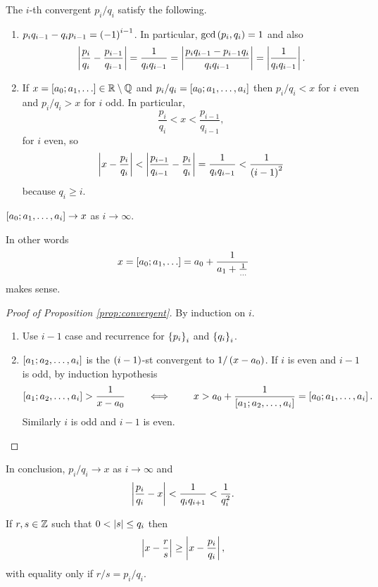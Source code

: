 \begin{proposition}
\label{prop:convergent}
The $ i $-th convergent $ p_i / q_i $ satisfy the following.
\begin{enumerate}
\item $ p_iq_{i - 1} - q_ip_{i - 1} = \rb{-1}^{i - 1} $. In particular, $ \gcd\rb{p_i, q_i} = 1 $ and also
$$ \abs{\dfrac{p_i}{q_i} - \dfrac{p_{i - 1}}{q_{i - 1}}} = \dfrac{1}{q_iq_{i - 1}} = \abs{\dfrac{p_iq_{i - 1} - p_{i - 1}q_i}{q_iq_{i - 1}}} = \abs{\dfrac{1}{q_iq_{i - 1}}}. $$
\item If $ x = \sb{a_0; a_1, \dots} \in \R \setminus \Q $ and $ p_i / q_i = \sb{a_0; a_1, \dots, a_i} $ then $ p_i / q_i < x $ for $ i $ even and $ p_i / q_i > x $ for $ i $ odd. In particular,
$$ \dfrac{p_i}{q_i} < x < \dfrac{p_{i - 1}}{q_{i - 1}}, $$
for $ i $ even, so
$$ \abs{x - \dfrac{p_i}{q_i}} < \abs{\dfrac{p_{i - 1}}{q_{i - 1}} - \dfrac{p_i}{q_i}} = \dfrac{1}{q_iq_{i - 1}} < \dfrac{1}{\rb{i - 1}^2} $$
because $ q_i \ge i $.
\end{enumerate}
\end{proposition}

\begin{corollary}
$ \sb{a_0; a_1, \dots, a_i} \to x $ as $ i \to \infty $.
\end{corollary}

In other words
$$ x = \sb{a_0; a_1, \dots} = a_0 + \dfrac{1}{a_1 + \tfrac{1}{\dots}} $$
makes sense.

\begin{proof}[Proof of Proposition \ref{prop:convergent}]
By induction on $ i $.
\begin{enumerate}
\item Use $ i - 1 $ case and recurrence for $ \cb{p_i}_i $ and $ \cb{q_i}_i $.
\item $ \sb{a_1; a_2, \dots, a_i} $ is the $ \rb{i - 1} $-st convergent to $ 1 / \rb{x - a_0} $. If $ i $ is even and $ i - 1 $ is odd, by induction hypothesis
$$ \sb{a_1; a_2, \dots, a_i} > \dfrac{1}{x - a_0} \qquad \iff \qquad x > a_0 + \dfrac{1}{\sb{a_1; a_2, \dots, a_i}} = \sb{a_0; a_1, \dots, a_i}. $$
Similarly $ i $ is odd and $ i - 1 $ is even.
\end{enumerate}
\end{proof}

In conclusion, $ p_i / q_i \to x $ as $ i \to \infty $ and
$$ \abs{\dfrac{p_i}{q_i} - x} < \dfrac{1}{q_iq_{i + 1}} < \dfrac{1}{q_i^2}. $$

\begin{theorem}
If $ r, s \in \Z $ such that $ 0 < \abs{s} \le q_i $ then
$$ \abs{x - \dfrac{r}{s}} \ge \abs{x - \dfrac{p_i}{q_i}}, $$
with equality only if $ r / s = p_i / q_i $.
\end{theorem}

